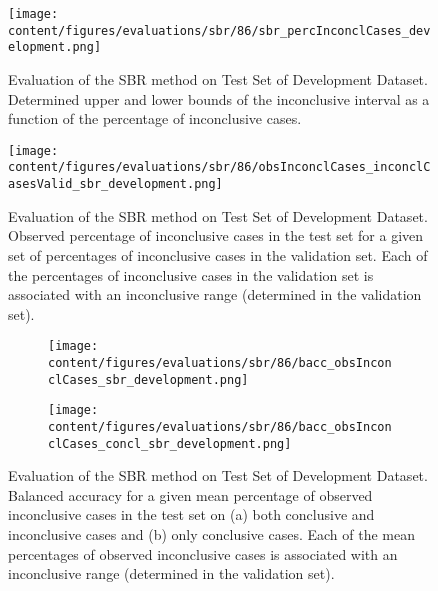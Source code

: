 \begin{figure}[t]
    \centering
    \texttt{[image: content/figures/evaluations/sbr/86/sbr\_percInconclCases\_development.png]}
    \caption{Evaluation of the SBR method on Test Set of Development Dataset. 
    Determined upper and lower bounds of the inconclusive interval as a function of the percentage of inconclusive cases.} 
    \label{fig:sbr_percInconclCases_development}
\end{figure}


\begin{figure}[h]
    \centering
    \texttt{[image: content/figures/evaluations/sbr/86/obsInconclCases\_inconclCasesValid\_sbr\_development.png]}
    \caption{Evaluation of the SBR method on Test Set of Development Dataset.
    Observed percentage of inconclusive cases in the test set 
    for a given set of percentages of inconclusive cases in the validation set.
    Each of the percentages of inconclusive cases in the validation set is associated 
    with an inconclusive range (determined in the validation set).} 
    \label{fig:obsInconclCases_inconclCasesValid_sbr_development}
\end{figure} 


\begin{figure}[t]
    \begin{subfigure}{0.9\textwidth}
      \centering
      \texttt{[image: content/figures/evaluations/sbr/86/bacc\_obsInconclCases\_sbr\_development.png]}
      \subcaption{}
      \label{fig:bacc_obsInconclCases_sbr_development}
    \end{subfigure}
    \hfill
    \begin{subfigure}{0.9\textwidth}
      \centering
      \texttt{[image: content/figures/evaluations/sbr/86/bacc\_obsInconclCases\_concl\_sbr\_development.png]}
      \subcaption{}
      \label{fig:bacc_obsInconclCases_concl_sbr_development}
    \end{subfigure}

    \caption{Evaluation of the SBR method on Test Set of Development Dataset.
    Balanced accuracy for a given mean percentage of observed inconclusive cases in the test set on 
    (a) both conclusive and inconclusive cases and (b) only conclusive cases. 
    Each of the mean percentages of observed inconclusive cases is associated with an inconclusive range (determined in the validation set). }
    \label{fig:bacc_obsInconclCases_sbr_development_full}
\end{figure}

